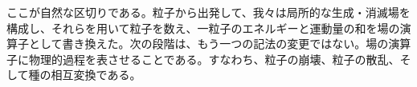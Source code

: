 \begin{classroomqa}
\end{classroomqa}

ここが自然な区切りである。粒子から出発して、我々は局所的な生成・消滅場を構成し、それらを用いて粒子を数え、一粒子のエネルギーと運動量の和を場の演算子として書き換えた。次の段階は、もう一つの記法の変更ではない。場の演算子に物理的過程を表させることである。すなわち、粒子の崩壊、粒子の散乱、そして種の相互変換である。
